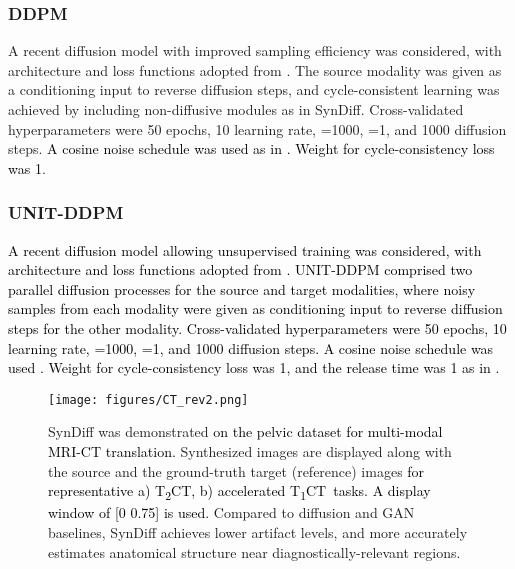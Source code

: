 \documentclass[journal,twoside,web]{ieeecolor}
\newcommand{\TtwoCT}{T\textsubscript{2}CT}
\newcommand{\ToneCT}{T\textsubscript{1}CT}
\newcommand*{\revhl}{\textcolor{black}}
\begin{document}
\subsubsection{DDPM}
A recent diffusion model with improved sampling efficiency was considered, with architecture and loss functions adopted from \cite{nichol2021improved}. The source modality was given as a conditioning input to reverse diffusion steps, and cycle-consistent learning was achieved by including non-diffusive modules as in SynDiff. Cross-validated hyperparameters were 50 epochs, 10 learning rate, =1000, =1, and 1000 diffusion steps. \revhl{A cosine noise schedule was used as in \cite{nichol2021improved}. Weight for cycle-consistency loss was 1}.

\subsubsection{UNIT-DDPM}
\revhl{A recent diffusion model allowing unsupervised training was considered, with architecture and loss functions adopted from \cite{sasaki2021unit}. UNIT-DDPM comprised two parallel diffusion processes for the source and target modalities, where noisy samples from each modality were given as conditioning input to reverse diffusion steps for the other modality. Cross-validated hyperparameters were 50 epochs, 10 learning rate, =1000, =1, and 1000 diffusion steps. A cosine noise schedule was used \cite{nichol2021improved}. Weight for cycle-consistency loss was 1, and the release time was 1 as in \cite{sasaki2021unit}.}

 
 
\begin{figure*}[t]
\centering
\texttt{[image: figures/CT\_rev2.png]}
\caption{SynDiff was demonstrated \revhl{on the pelvic dataset for multi-modal MRI-CT translation.} Synthesized images are displayed along with the source and the ground-truth target (reference) images \revhl{for representative a) \TtwoCT, b) accelerated \ToneCT~tasks. A display window of [0 0.75] is used.} Compared to diffusion and GAN baselines, SynDiff achieves lower artifact levels, and more accurately estimates anatomical structure near diagnostically-relevant regions.}
\label{fig:mr_ct}
\end{figure*}


\vspace{-0.35cm}
\end{document}
